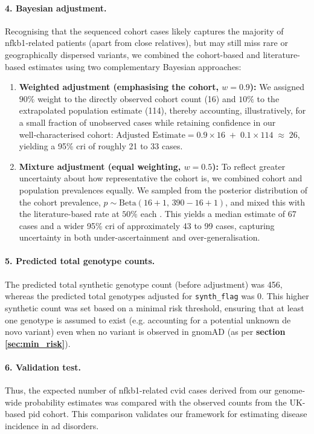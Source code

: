 \paragraph{4. Bayesian adjustment.}
Recognising that the sequenced cohort cases likely captures the majority of \ac{nfkb1}‑related patients (apart from close relatives), but may still miss rare or geographically dispersed variants, we combined the cohort-based and literature-based estimates using two complementary Bayesian approaches:

\begin{enumerate}
  \item \textbf{Weighted adjustment (emphasising the cohort, \(w=0.9\)):}  
  We assigned \(90\%\) weight to the directly observed cohort count (16) and \(10\%\) to the extrapolated population estimate (114), thereby accounting, illustratively, for a small fraction of unobserved cases while retaining confidence in our well‑characterised cohort:
$  \text{Adjusted Estimate}
    = 0.9 \times 16 \;+\; 0.1 \times 114
    \;\approx\; 26$,
  yielding a 95\% \ac{cri} of roughly 21 to 33 cases.
  \item \textbf{Mixture adjustment (equal weighting, \(w=0.5\)):}  
  To reflect greater uncertainty about how representative the cohort is, we combined cohort and population prevalences equally. 
  We sampled from the posterior distribution of the cohort prevalence,
   $p \sim \mathrm{Beta}(16 + 1,\,390 - 16 + 1)$,
  and mixed this with the literature-based rate at \(50\%\) each \cite{tuijnenburgNFKB12018, who1997primary, oksenhendler2008infections}. 
  This yields a median estimate of 67 cases and a wider 95\% \ac{cri} of approximately 43 to 99 cases, capturing uncertainty in both under-ascertainment and over-generalisation.
\end{enumerate}

\paragraph{5. Predicted total genotype counts.}
The predicted total synthetic genotype count (before adjustment) was 456, whereas the predicted total genotypes adjusted for \texttt{synth\_flag} was 0. 
This higher synthetic count was set based on a minimal risk threshold, ensuring that at least one genotype is assumed to exist (e.g. accounting for a potential unknown de novo variant) even when no variant is observed in gnomAD (as per \textbf{section
\ref{sec:min_risk}}).

\paragraph{6. Validation test.}
Thus, the expected number of \ac{nfkb1}-related \ac{cvid} cases derived from our genome-wide probability estimates was compared with the observed counts from the UK-based \ac{pid} cohort. 
This comparison validates our framework for estimating disease incidence in \ac{ad} disorders.

